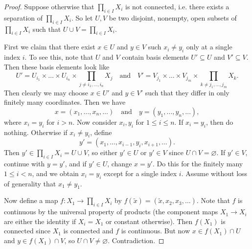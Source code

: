\begin{proof}
  Suppose otherwise that $\prod_{i \in I} X_i$
  is not connected, i.e. there exists a
  separation of $\prod_{i \in I} X_i$.
  So let $U, V$ be two disjoint, nonempty, open
  subsets of $\prod_{i \in I} X_i$ such that
  $U \cup V = \prod_{i \in I} X_i$.

  First we claim that there exist
  $x \in U$ and $y \in V$ such $x_i \ne y_i$
  only at a single index $i$. To see this,
  note that $U$ and $V$ contain basis elements
  $U' \subseteq U$ and $V' \subseteq V$. Then
  these basis elements look like
  \[
    U' = U_{i_1} \times \dots \times U_{i_n}
    \times \prod_{j \ne i_1, \dots, i_n} X_j
    \quad \text{and} \quad
    V' = V_{j_1} \times \dots \times V_{j_m}
    \times \prod_{k \ne j_1, \dots, j_m} X_k.
  \]
  Then clearly we may choose $x \in U'$ and
  $y \in V'$ such that they differ in only
  finitely many coordinates. Then we have
  \[
    x = (x_1, \dots, x_n, \dots)
    \quad \text{and} \quad
    y = (y_1, \dots, y_n, \dots),
  \]
  where $x_i = y_i$ for $i > n$.
  Now consider $x_i, y_i$ for $1 \le i \le n$.
  If $x_i = y_i$, then do nothing. Otherwise
  if $x_i \ne y_i$, define
  \[
    y' = (x_1, \dots, x_{i-1}, y_i, x_{i+1}, \dots).
  \]
  Then $y' \in \prod_{i \in I} X_i = U \cup V$,
  so either $y' \in U$ or $y' \in V$ since
  $U \cap V = \varnothing$. If $y' \in V$,
  continue with $y = y'$, and if $y' \in U$,
  change $x = y'$. Do this for the finitely many
  $1 \le i < n$, and we obtain
  $x_i = y_i$ except for a single index $i$.
  Assume without loss of generality that $x_1 \ne y_1$.

  Now define a map $f : X_1 \to \prod_{i \in I} X_i$
  by
  $f(\widetilde{x}) = (\widetilde{x}, x_2, x_3, \dots)$.
  Note that $f$ is continuous by the universal
  property of products (the component maps
  $X_1 \to X_i$ are either the identity if
  $X_i = X_1$ or constant otherwise). Then
  $f(X_1)$ is connected since $X_1$ is connected
  and $f$ is continuous. But now $x \in f(X_1) \cap U$
  and $y \in f(X_1) \cap V$, so
  $U \cap V \ne \varnothing$. Contradiction.
\end{proof}
